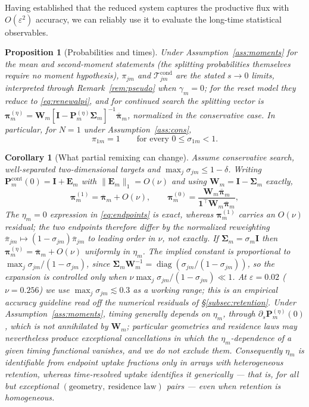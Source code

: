 \documentclass[pdflatex,sn-mathphys-num]{sn-jnl}
\numberwithin{equation}{section}
\theoremstyle{thmstyleone}%
\newtheorem{proposition}[theorem]{Proposition}
\newtheorem{corollary}[theorem]{Corollary}
\theoremstyle{definition}
\theoremstyle{remark}
\DeclareMathOperator{\diag}{diag}
\begin{document}
Having established that the reduced system captures the productive flux with $O(\varepsilon^2)$ accuracy, we can reliably use it to evaluate the long-time statistical observables.

\begin{proposition}[Probabilities and times]\label{prop:pt}
Under Assumption~\ref{ass:moments} for the mean and second-moment statements (the splitting probabilities themselves require no moment hypothesis), $\pi_{jm}$ and $\mathcal T^{\mathrm{cond}}_{jm}$ are the stated $s\to0$ limits, interpreted through Remark~\ref{rem:pseudo} when $\gamma_m=0$; for the reset model they reduce to \eqref{eq:renewalpi}, and for continued search the splitting vector is $\bm\pi^{(\eta)}_m=\bm W_m[\mathbf I-\mathbf P^{(\eta)}_m\bm\Sigma_m]^{-1} \overline{\bm\pi}_m$, normalized in the conservative case. In particular, for $N=1$ under Assumption~\ref{ass:cons},
\begin{equation}
\pi_{1m}=1\qquad\text{for every }0\le\sigma_{1m}<1 .
\label{eq:onetarget}
\end{equation}
\end{proposition}

\begin{corollary}[What partial remixing can change]\label{cor:remix}
Assume conservative search, well-separated two-dimensional targets and $\max_j\sigma_{jm}\le1-\delta$. Writing $\mathbf P^{\mathrm{cont}}_m(0)=\mathbf I+\mathbf E_m$ with $\|\mathbf E_m\|_1=O(\nu)$ and using $\bm W_m=\mathbf I-\bm\Sigma_m$ exactly,
\begin{equation}
\bm\pi^{(1)}_m=\overline{\bm\pi}_m+O(\nu),
\qquad
\bm\pi^{(0)}_m=\frac{\bm W_m\overline{\bm\pi}_m}
{\mathbf1^\top\bm W_m\overline{\bm\pi}_m},
\label{eq:endpoints}
\end{equation}
The $\eta_m=0$ expression in \eqref{eq:endpoints} is exact, whereas $\bm\pi^{(1)}_m$ carries an $O(\nu)$ residual; the two endpoints therefore differ by the normalized reweighting $\overline\pi_{jm}\mapsto(1-\sigma_{jm})\overline\pi_{jm}$ to leading order in $\nu$, not exactly. If $\bm\Sigma_m=\sigma_m\mathbf I$ then $\bm\pi^{(\eta)}_m=\overline{\bm\pi}_m+O(\nu)$ uniformly in $\eta_m$. The implied constant is proportional to $\max_j\sigma_{jm}/(1-\sigma_{jm})$, since $\bm\Sigma_m\bm W_m^{-1}=\diag(\sigma_{jm}/(1-\sigma_{jm}))$, so the expansion is controlled only when $\nu\max_j\sigma_{jm}/(1-\sigma_{jm})\ll1$. At
$\varepsilon=0.02$ ($\nu=0.256$) we use $\max_j\sigma_{jm}\lesssim0.3$ as a working range; this is an empirical accuracy guideline read off the numerical residuals of \S\ref{subsec:retention}. Under Assumption~\ref{ass:moments}, timing generally depends on $\eta_m$, through $\partial_s\mathbf
P^{(\eta)}_m(0)$, which is not annihilated by $\bm W_m$; particular geometries and residence laws may nevertheless produce exceptional cancellations in which the $\eta_m$-dependence of a given timing functional vanishes, and we do not exclude them. Consequently $\eta_m$ is identifiable from endpoint uptake fractions only in arrays with heterogeneous retention, whereas time-resolved uptake identifies
it generically --- that is, for all but exceptional $(\text{geometry},\ \text{residence law})$ pairs --- even when retention is homogeneous.
\end{corollary}
\end{document}
